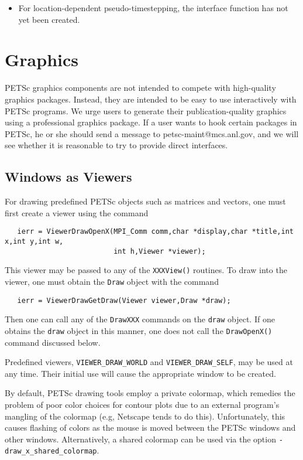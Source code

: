 {\begin{itemize}
\item For location-dependent pseudo-timestepping, the interface function
      has not yet been created.
\end{itemize}


\chapter{Graphics}
\label{ch:graphics}

PETSc graphics components are not intended to compete with 
high-quality graphics packages.  Instead, they are intended to be 
easy to use interactively with PETSc programs. We urge users
to generate their publication-quality graphics using a
professional graphics package. If a user wants to hook
certain packages in PETSc, he or she should send a message to 
petsc-maint@mcs.anl.gov, and we will see whether it is reasonable
to try to provide direct interfaces.

\section{Windows as Viewers}
For drawing predefined PETSc objects such as matrices and vectors, one must 
first create a viewer using the 
command 
\begin{verbatim}
   ierr = ViewerDrawOpenX(MPI_Comm comm,char *display,char *title,int x,int y,int w,
                          int h,Viewer *viewer);
\end{verbatim}
This viewer may be passed to any of the {\tt XXXView()} routines.
To draw into the viewer, one must obtain the {\tt Draw} object with the
command 
\begin{verbatim}
   ierr = ViewerDrawGetDraw(Viewer viewer,Draw *draw);
\end{verbatim}
Then one can call any of the {\tt DrawXXX} commands on the {\tt draw}
object. If one obtains the {\tt draw} object in this manner, 
one does not call the {\tt DrawOpenX()} command discussed below.

  
Predefined viewers, {\tt VIEWER\_DRAW\_WORLD} 
and {\tt VIEWER\_DRAW\_SELF}, may be used at any time. Their initial
use will cause the appropriate window to be created.

\medskip
By default, PETSc drawing tools employ a private colormap,
which remedies the problem of poor color choices for contour plots due
to an external program's mangling of the colormap (e.g, Netscape tends
to do this).
Unfortunately, this causes flashing of colors as the mouse is moved
between the PETSc windows and other windows.  Alternatively, a shared
colormap can be used via the option {\tt -draw\_x\_shared\_colormap}.

}
